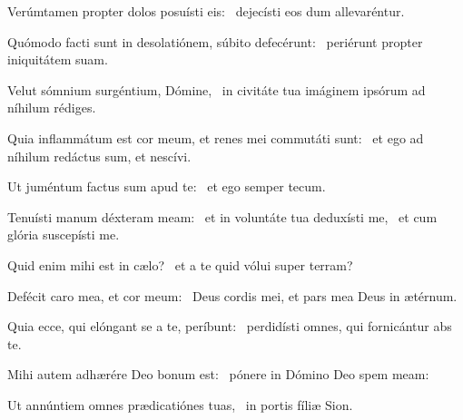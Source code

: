 \item Verúmtamen propter dolos posuísti eis:~\psstar{} dejecísti eos dum allevaréntur.

\item Quómodo facti sunt in desolatiónem, súbito defecérunt:~\psstar{} periérunt propter iniquitátem suam.

\item Velut sómnium surgéntium, Dómine,~\psstar{} in civitáte tua imáginem ipsórum ad níhilum rédiges.

\item Quia inflammátum est cor meum, et renes mei commutáti sunt:~\psstar{} et ego ad níhilum redáctus sum, et nescívi.

\item Ut juméntum factus sum apud te:~\psstar{} et ego semper tecum.

\item Tenuísti manum déxteram meam:~\pscross{} et in voluntáte tua deduxísti me,~\psstar{} et cum glória suscepísti me.

\item Quid enim mihi est in cælo?~\psstar{} et a te quid vólui super terram?

\item Defécit caro mea, et cor meum:~\psstar{} Deus cordis mei, et pars mea Deus in ætérnum.

\item Quia ecce, qui elóngant se a te, períbunt:~\psstar{} perdidísti omnes, qui fornicántur abs te.

\item Mihi autem adhærére Deo bonum est:~\psstar{} pónere in Dómino Deo spem meam:

\item Ut annúntiem omnes prædicatiónes tuas,~\psstar{} in portis fíliæ Sion.

